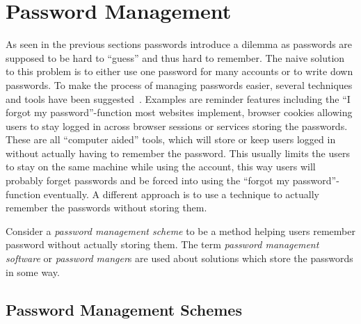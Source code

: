 \section{Password Management}
As seen in the previous sections passwords introduce a dilemma as passwords are supposed to be hard to ``guess'' and thus hard to remember. The naive solution to this problem is to either use one password for many accounts or to write down passwords. To make the process of managing passwords easier, several techniques and tools have been suggested~\cite{management-strategies}. Examples are reminder features including the ``I forgot my password''-function most websites implement, browser cookies allowing users to stay logged in across browser sessions or services storing the passwords. These are all ``computer aided'' tools, which will store or keep users logged in without actually having to remember the password. This usually limits the users to stay on the same machine while using the account, this way users will probably forget passwords and be forced into using the ``forgot my password''-function eventually. A different approach is to use a technique to actually remember the passwords without storing them.
\par Consider a \emph{password management scheme} to be a method helping users remember password without actually storing them. The term \emph{password management software} or \emph{password manger}s are used about solutions which store the passwords in some way.

\subsection{Password Management Schemes}
 
